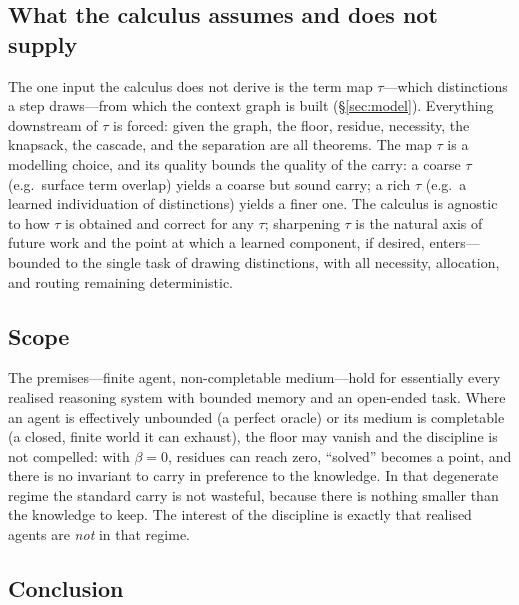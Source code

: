 \documentclass[11pt,a4paper]{article}
\theoremstyle{thmstyle}
\theoremstyle{definition}
\theoremstyle{remark}
\newcommand{\flo}{\beta}                %
\begin{document}
\subsection{What the calculus assumes and does not supply}

The one input the calculus does not derive is the term map $\tau$---which
distinctions a step draws---from which the context graph is built
(\S\ref{sec:model}). Everything downstream of $\tau$ is forced: given the graph,
the floor, residue, necessity, the knapsack, the cascade, and the separation are
all theorems. The map $\tau$ is a modelling choice, and its quality bounds the
quality of the carry: a coarse $\tau$ (e.g.\ surface term overlap) yields a coarse
but sound carry; a rich $\tau$ (e.g.\ a learned individuation of distinctions)
yields a finer one. The calculus is agnostic to how $\tau$ is obtained and correct
for any $\tau$; sharpening $\tau$ is the natural axis of future work and the point
at which a learned component, if desired, enters---bounded to the single task of
drawing distinctions, with all necessity, allocation, and routing remaining
deterministic.

\subsection{Scope}

The premises---finite agent, non-completable medium---hold for essentially every
realised reasoning system with bounded memory and an open-ended task. Where an
agent is effectively unbounded (a perfect oracle) or its medium is completable (a
closed, finite world it can exhaust), the floor may vanish and the discipline is
not compelled: with $\flo=0$, residues can reach zero, ``solved'' becomes a point,
and there is no invariant to carry in preference to the knowledge. In that
degenerate regime the standard carry is not wasteful, because there is nothing
smaller than the knowledge to keep. The interest of the discipline is exactly
that realised agents are \emph{not} in that regime.

\subsection{Conclusion}
\end{document}
